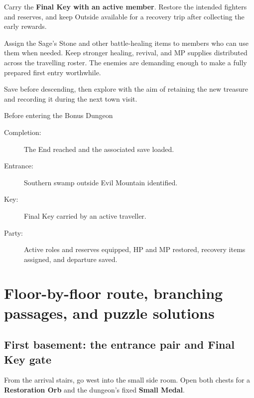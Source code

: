 Carry the \textbf{Final Key with an active member}.
Restore the intended fighters and reserves, and keep
Outside available for a recovery trip after collecting
the early rewards.

Assign the Sage's Stone and other battle-healing items
to members who can use them when needed. Keep stronger
healing, revival, and MP supplies distributed across
the travelling roster. The enemies are demanding enough
to make a fully prepared first entry worthwhile.

Save before descending, then explore with the aim of
retaining the new treasure and recording it during
the next town visit.

\begin{routecheck}[breakable=false]{Before entering the Bonus Dungeon}
\begin{description}
  \item[Completion:] The End reached and the associated save loaded.
  \item[Entrance:] Southern swamp outside Evil Mountain identified.
  \item[Key:] Final Key carried by an active traveller.
  \item[Party:] Active roles and reserves equipped, HP and MP
    restored, recovery items assigned, and departure saved.
\end{description}
\end{routecheck}

\section{Floor-by-floor route, branching passages, and puzzle solutions}

\subsection*{First basement: the entrance pair and Final Key gate}

From the arrival stairs, go west into the small side room.
Open both chests for a \textbf{Restoration Orb} and the
dungeon's fixed \textbf{Small Medal}.


